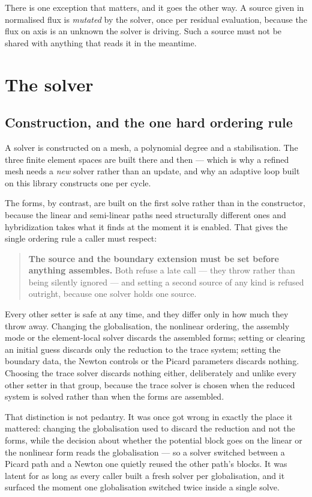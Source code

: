 There is one exception that matters, and it goes the other way. A source given
in normalised flux is \emph{mutated} by the solver, once per residual
evaluation, because the flux on axis is an unknown the solver is driving. Such a
source must not be shared with anything that reads it in the meantime.

\section{The solver}

\subsection{Construction, and the one hard ordering rule}

A solver is constructed on a mesh, a polynomial degree and a stabilisation. The
three finite element spaces are built there and then --- which is why a refined
mesh needs a \emph{new} solver rather than an update, and why an adaptive loop
built on this library constructs one per cycle.

The forms, by contrast, are built on the first solve rather than in the
constructor, because the linear and semi-linear paths need structurally
different ones and hybridization takes what it finds at the moment it is
enabled. That gives the single ordering rule a caller must respect:

\begin{quote}
	\textbf{The source and the boundary extension must be set before anything
	assembles.} Both refuse a late call --- they throw rather than being
	silently ignored --- and setting a second source of any kind is refused
	outright, because one solver holds one source.
\end{quote}

Every other setter is safe at any time, and they differ only in how much they
throw away. Changing the globalisation, the nonlinear ordering, the assembly
mode or the element-local solver discards the assembled forms; setting or
clearing an initial guess discards only the reduction to the trace system;
setting the boundary data, the Newton controls or the Picard parameters discards
nothing. Choosing the trace solver discards nothing either, deliberately and
unlike every other setter in that group, because the trace solver is chosen when
the reduced system is solved rather than when the forms are assembled.

That distinction is not pedantry. It was once got wrong in exactly the place it
mattered: changing the globalisation used to discard the reduction and not the
forms, while the decision about whether the potential block goes on the linear
or the nonlinear form reads the globalisation --- so a solver switched between a
Picard path and a Newton one quietly reused the other path's blocks. It was
latent for as long as every caller built a fresh solver per globalisation, and it
surfaced the moment one globalisation switched twice inside a single solve.


